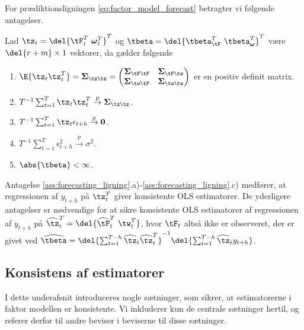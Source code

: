 %
For prædiktionsligningen \eqref{eq:factor_model_forecast} betragter vi følgende antagelser.
%
\begin{ass}[Prædiktionsligning] \label{ass:forecasting_ligning}
Lad \(\tz_t = \del{\tF_t^T \ \boldsymbol{\omega}_t^T}^T\) og \(\tbeta = \del{\tbeta_{\tF}^T \ \tbeta_{\boldsymbol{\omega}}^T}^T\) være \(\del{r+m} \times 1\) vektorer, da gælder følgende
\begin{enumerate}[label=\alph*)]
\item \(\E{\tz_t \tz_t^T} = \boldsymbol{\Sigma}_{\tz \tz} = \begin{pmatrix}
\boldsymbol{\Sigma}_{\tF \tF} & \boldsymbol{\Sigma}_{\tF \tw} \\
\boldsymbol{\Sigma}_{\tw \tF} & \boldsymbol{\Sigma}_{\tw \tw}
\end{pmatrix} \) er en positiv definit matrix.
\item \(T^{-1} \sum_{t=1}^T \tz_t \tz_t^T \overset{p}{\rightarrow} \boldsymbol{\Sigma}_{\tz \tz}\).
\item \(T^{-1} \sum_{t=1}^T \tz_t \epsilon_{t+h} \overset{p}{\rightarrow} \mathbf{0}\).
\item  \(T^{-1} \sum_{t=1}^T \epsilon_{t+h}^2 \overset{p}{\rightarrow} \sigma^2\).
\item \(\abs{\tbeta} < \infty\).
\end{enumerate}
\end{ass}
%
Antagelse \ref{ass:forecasting_ligning}.a)-\ref{ass:forecasting_ligning}.c) medfører, at regressionen af \(y_{t+h}\) på \(\tz_t^T\) giver konsistente OLS estimatorer.
De yderligere antagelser er nødvendige for at sikre konsistente OLS estimatorer af regressionen af \(y_{t+h}\) på \(\widehat{\tz}_t^T =\del{\widehat{\tF}_t^T \ \tw_t^T}\), hvor \(\tF_t\) altså ikke er observeret, der er givet ved \(\widehat{\tbeta} = \del{\sum_{t=1}^{T-h} \widehat{\tz}_t \widehat{\tz}_t^T}^{-1} \del{\sum_{t=1}^{T-h} \widehat{\tz}_t y_{t+h}}\).

\subsection{Konsistens af estimatorer}
I dette underafsnit introduceres nogle sætninger, som sikrer, at estimatorerne i faktor modellen er konsistente.
Vi inkluderer kun de centrale sætninger hertil, og referer derfor til andre beviser i beviserne til disse sætninger.

